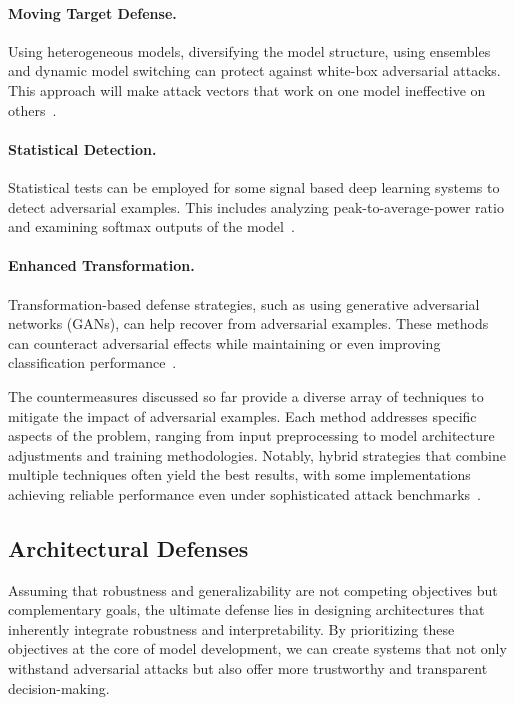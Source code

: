 \documentclass[a4paper, oneside]{discothesis}
\begin{document}
\paragraph{Moving Target Defense.} Using heterogeneous models, diversifying the model structure, using ensembles and dynamic model switching can protect against white-box adversarial attacks. This approach will make attack vectors that work on one model ineffective on others~\cite{Li2023wAdvMTDAM}.

\paragraph{Statistical Detection.} Statistical tests can be employed for some signal based deep learning systems to detect adversarial examples. This includes analyzing peak-to-average-power ratio and examining softmax outputs of the model~\cite{KokaljFilipovic2019AdversarialEI}.

\paragraph{Enhanced Transformation.} Transformation-based defense strategies, such as using generative adversarial networks (GANs), can help recover from adversarial examples. These methods can counteract adversarial effects while maintaining or even improving classification performance~\cite{Zhao2023EITGANAT}.

The countermeasures discussed so far provide a diverse array of techniques to mitigate the impact of adversarial examples. Each method addresses specific aspects of the problem, ranging from input preprocessing to model architecture adjustments and training methodologies. Notably, hybrid strategies that combine multiple techniques often yield the best results, with some implementations achieving reliable performance even under sophisticated attack benchmarks~\cite{ji2023benchmarking}.

\subsection{Architectural Defenses}

Assuming that robustness and generalizability are not competing objectives but complementary goals, the ultimate defense lies in designing architectures that inherently integrate robustness and interpretability. By prioritizing these objectives at the core of model development, we can create systems that not only withstand adversarial attacks but also offer more trustworthy and transparent decision-making.
\end{document}
